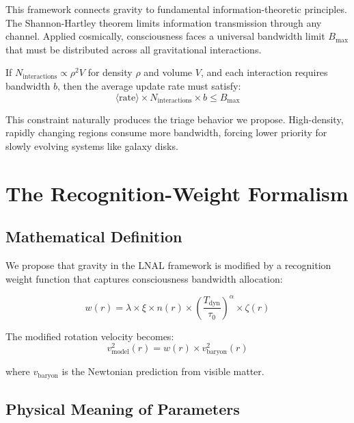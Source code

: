 \documentclass[twocolumn,prd,amsmath,amssymb,aps,superscriptaddress,nofootinbib]{revtex4-2}
\begin{document}
This framework connects gravity to fundamental information-theoretic principles. The Shannon-Hartley theorem limits information transmission through any channel. Applied cosmically, consciousness faces a universal bandwidth limit $B_{\text{max}}$ that must be distributed across all gravitational interactions.

If $N_{\text{interactions}} \propto \rho^2 V$ for density $\rho$ and volume $V$, and each interaction requires bandwidth $b$, then the average update rate must satisfy:
\begin{equation}
\langle \text{rate} \rangle \times N_{\text{interactions}} \times b \leq B_{\text{max}}
\end{equation}

This constraint naturally produces the triage behavior we propose. High-density, rapidly changing regions consume more bandwidth, forcing lower priority for slowly evolving systems like galaxy disks.

\section{The Recognition-Weight Formalism}
\label{sec:formalism}

\subsection{Mathematical Definition}

We propose that gravity in the LNAL framework is modified by a recognition weight function that captures consciousness bandwidth allocation:

\begin{equation}
w(r) = \lambda \times \xi \times n(r) \times \left(\frac{T_{\text{dyn}}}{\tau_0}\right)^\alpha \times \zeta(r)
\label{eq:recognition_weight}
\end{equation}

The modified rotation velocity becomes:
\begin{equation}
v_{\text{model}}^2(r) = w(r) \times v_{\text{baryon}}^2(r)
\label{eq:v_model}
\end{equation}

where $v_{\text{baryon}}$ is the Newtonian prediction from visible matter.

\subsection{Physical Meaning of Parameters}
\end{document}
